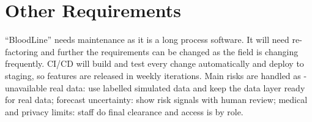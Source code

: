 \documentclass{scrreprt}
\begin{document}
\chapter{Other Requirements}
``BloodLine'' needs maintenance as it is a long process software. It will need re-factoring and further the requirements can be changed as the field is changing frequently. CI/CD will build and test every change automatically and deploy to staging, so features are released in weekly iterations. Main risks are handled as - unavailable real data: use labelled simulated data and keep the data layer ready for real data; forecast uncertainty: show risk signals with human review; medical and privacy limits: staff do final clearance and access is by role.
\end{document}
